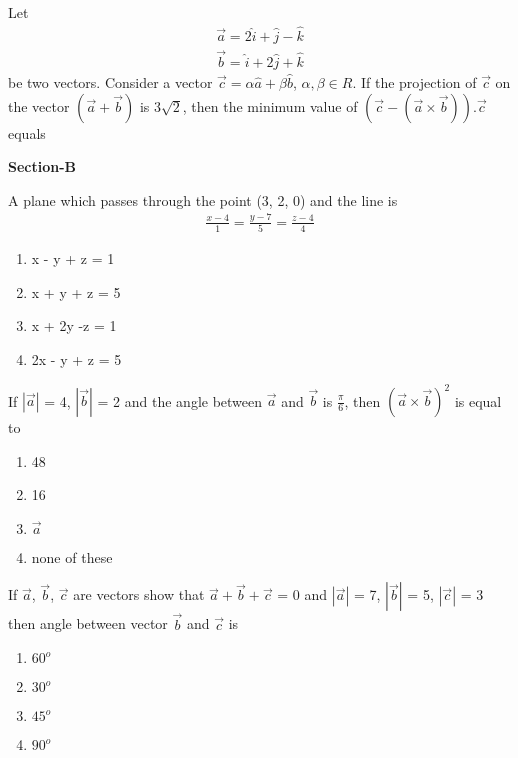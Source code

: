 \item Let 
\begin{align*}
\overrightarrow{a} = 2\hat{i} + \hat{j} - \hat{k}
\end{align*}
\begin{align*}
\overrightarrow{b} = \hat{i} + 2\hat{j} + \hat{k}
\end{align*}
be two vectors. Consider a vector $\overrightarrow{c} = \alpha\hat{a} + \beta\hat{b}$, $\alpha, \beta \in R$. If the projection of $\overrightarrow{c}$ on the vector $(\overrightarrow{a} + \overrightarrow{b})$ is 3$\sqrt{2}$, then the minimum value of $(\overrightarrow{c}-(\overrightarrow{a} \times \overrightarrow{b})).\overrightarrow{c}$ equals

\textbf{Section-B}

\item A plane which passes through the point (3, 2, 0) and the line is
\begin{align*}
\frac{x-4}{1} = \frac{y-7}{5} = \frac{z-4}{4}
\end{align*}
\begin{enumerate}
\item x - y + z = 1
\item x + y + z = 5
\item x + 2y -z = 1
\item 2x - y + z = 5
\end{enumerate}

\item If $|\overrightarrow{a}|$ = 4, $|\overrightarrow{b}|$ = 2 and the angle between $\overrightarrow{a}$ and $\overrightarrow{b}$ is $\frac{\pi}{6}$, then $(\overrightarrow{a} \times \overrightarrow{b})^{2}$ is equal to
\begin{enumerate}
\item 48
\item 16
\item $\overrightarrow{a}$
\item none of these
\end{enumerate}

\item If $\overrightarrow{a}$, $\overrightarrow{b}$, $\overrightarrow{c}$ are vectors show that $\overrightarrow{a} + \overrightarrow{b} + \overrightarrow{c}$ = 0 and $|\overrightarrow{a}|$ = 7, $|\overrightarrow{b}|$ = 5, 
$|\overrightarrow{c}|$ = 3 then angle between vector $\overrightarrow{b}$ and $\overrightarrow{c}$ is
\begin{enumerate}
\item $60^{o}$
\item $30^{o}$
\item $45^{o}$
\item $90^{o}$
\end{enumerate}

